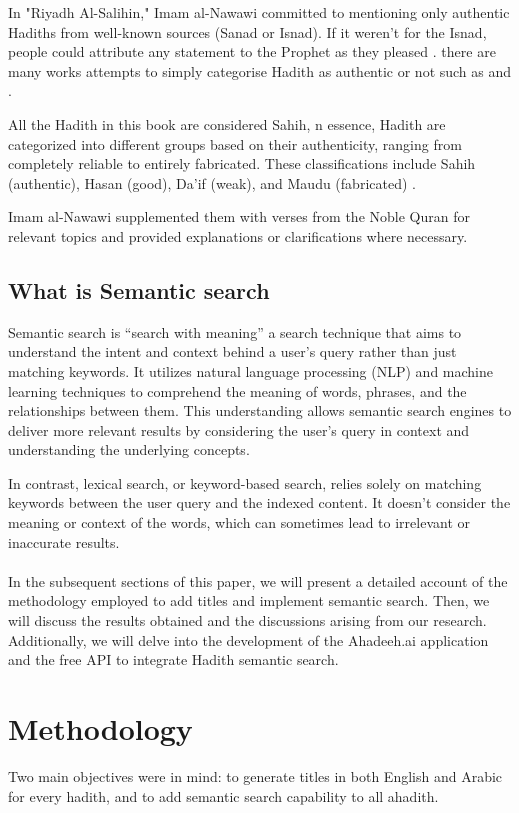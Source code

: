 \documentclass{svproc}
\begin{document}
In "Riyadh Al-Salihin," Imam al-Nawawi committed to mentioning only authentic Hadiths from well-known sources (Sanad or Isnad). If it weren't for the Isnad, people could attribute any statement to the Prophet as they pleased \cite{hasan1994introduction}. there are many works attempts to simply categorise Hadith as authentic or
not such as \cite{bilal2012muhadith} and \cite{hakak2022digital}. 

All the Hadith in this book are considered Sahih, n essence, Hadith are categorized into different groups based on their authenticity, ranging from completely reliable to entirely fabricated. These classifications include Sahih (authentic), Hasan (good), Da'if (weak), and Maudu (fabricated) \cite{aldhaln2012improving}.



Imam al-Nawawi supplemented them with verses from the Noble Quran for relevant topics and provided explanations or clarifications where necessary. \cite{site_Tawseef_book}

\subsection{What is Semantic search}
Semantic search is “search with meaning” \cite{bast2016semantic} a search technique that aims to understand the intent and context behind a user's query rather than just matching keywords. It utilizes natural language processing (NLP) and machine learning techniques to comprehend the meaning of words, phrases, and the relationships between them. This understanding allows semantic search engines to deliver more relevant results by considering the user's query in context and understanding the underlying concepts.

In contrast, lexical search, or keyword-based search, relies solely on matching keywords between the user query and the indexed content. It doesn't consider the meaning or context of the words, which can sometimes lead to irrelevant or inaccurate results.
\\
\\
In the subsequent sections of this paper, we will present a detailed account of the methodology employed to add titles and implement semantic search. Then, we will discuss the results obtained and the discussions arising from our research. Additionally, we will delve into the development of the Ahadeeh.ai application and the free API to integrate Hadith semantic search.

\section{Methodology}
Two main objectives were in mind: to generate titles in both English and Arabic for every hadith, and to add semantic search capability to all ahadith.
\end{document}
